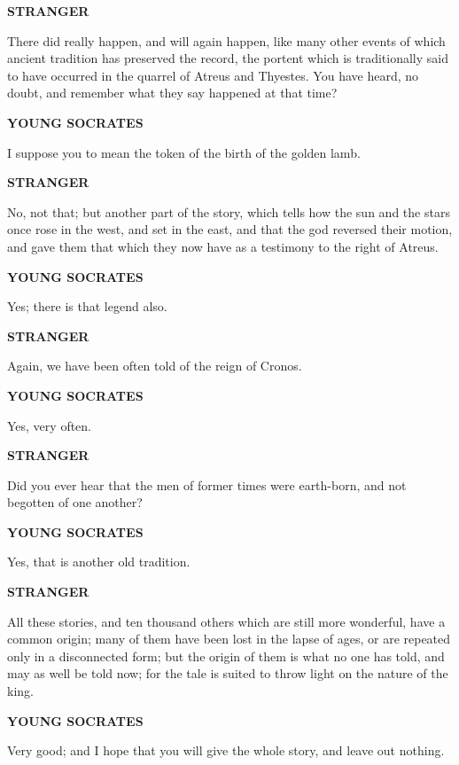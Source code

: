 \documentclass[11pt,letter]{article}
\begin{document}
\par \textbf{STRANGER}
\par   There did really happen, and will again happen, like many other events of which ancient tradition has preserved the record, the portent which is traditionally said to have occurred in the quarrel of Atreus and Thyestes. You have heard, no doubt, and remember what they say happened at that time?

\par \textbf{YOUNG SOCRATES}
\par   I suppose you to mean the token of the birth of the golden lamb.

\par \textbf{STRANGER}
\par   No, not that; but another part of the story, which tells how the sun and the stars once rose in the west, and set in the east, and that the god reversed their motion, and gave them that which they now have as a testimony to the right of Atreus.

\par \textbf{YOUNG SOCRATES}
\par   Yes; there is that legend also.

\par \textbf{STRANGER}
\par   Again, we have been often told of the reign of Cronos.

\par \textbf{YOUNG SOCRATES}
\par   Yes, very often.

\par \textbf{STRANGER}
\par   Did you ever hear that the men of former times were earth-born, and not begotten of one another?

\par \textbf{YOUNG SOCRATES}
\par   Yes, that is another old tradition.

\par \textbf{STRANGER}
\par   All these stories, and ten thousand others which are still more wonderful, have a common origin; many of them have been lost in the lapse of ages, or are repeated only in a disconnected form; but the origin of them is what no one has told, and may as well be told now; for the tale is suited to throw light on the nature of the king.

\par \textbf{YOUNG SOCRATES}
\par   Very good; and I hope that you will give the whole story, and leave out nothing.
\end{document}
